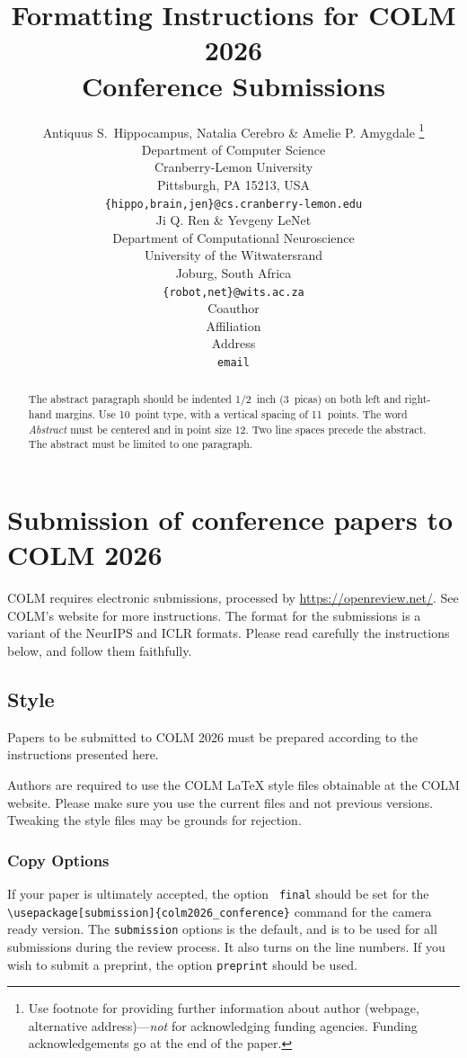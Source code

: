 \documentclass{article} %
\title{Formatting Instructions for COLM 2026 \\ Conference Submissions}
\author{Antiquus S.~Hippocampus, Natalia Cerebro \& Amelie P. Amygdale \thanks{ Use footnote for providing further information
about author (webpage, alternative address)---\emph{not} for acknowledging
funding agencies.  Funding acknowledgements go at the end of the paper.} \\
Department of Computer Science\\
Cranberry-Lemon University\\
Pittsburgh, PA 15213, USA \\
\texttt{\{hippo,brain,jen\}@cs.cranberry-lemon.edu} \\
\And
Ji Q. Ren \& Yevgeny LeNet \\
Department of Computational Neuroscience \\
University of the Witwatersrand \\
Joburg, South Africa \\
\texttt{\{robot,net\}@wits.ac.za} \\
\AND
Coauthor \\
Affiliation \\
Address \\
\texttt{email}
}
\begin{document}
\ifcolmsubmission
\linenumbers
\fi

\maketitle

\begin{abstract}
The abstract paragraph should be indented 1/2~inch (3~picas) on both left and
right-hand margins. Use 10~point type, with a vertical spacing of 11~points.
The word \textit{Abstract} must be centered and in point size 12. Two
line spaces precede the abstract. The abstract must be limited to one
paragraph.
\end{abstract}

\section{Submission of conference papers to COLM 2026}

COLM requires electronic submissions, processed by
\url{https://openreview.net/}. See COLM's website for more instructions.
The format for the submissions is a variant of the NeurIPS and ICLR formats.
Please read carefully the instructions below, and follow them
faithfully.


\subsection{Style}

Papers to be submitted to COLM 2026 must be prepared according to the
instructions presented here.


Authors are required to use the COLM \LaTeX{} style files obtainable at the
COLM website. Please make sure you use the current files and
not previous versions. Tweaking the style files may be grounds for rejection.

\subsubsection{Copy Options}

If your paper is ultimately accepted, the option {\tt
  {final}} should be set  for the {\tt {\textbackslash}usepackage[submission]\{colm2026\_conference\}} command for the camera ready version. The {\tt submission} options is the default, and is to be used for all submissions during the review process. It also turns on the line numbers. If you wish to submit a preprint, the option {\tt preprint} should be used.
  
\end{document}
